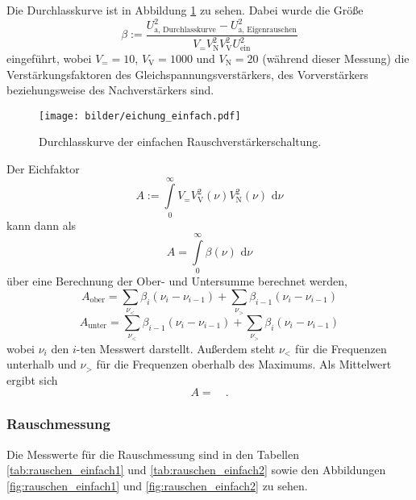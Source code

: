 		Die Durchlasskurve ist in Abbildung \ref{fig:eichung_einfach} zu sehen. Dabei wurde die Größe 
		\begin{equation}
		\beta := \frac{U^2_\text{a, Durchlasskurve}-U_\text{a, Eigenrauschen}^2}
		{V_= V_\text{N}^2 V_\text{V}^2  U^2_\text{ein}}
		\end{equation}
		eingeführt, wobei $V_= =10$, $V_\text{V}=1000$ und $V_\text{N}=20$ (während dieser Messung)
		die Verstärkungsfaktoren des Gleichspannungsverstärkers, des Vorverstärkers beziehungsweise 
		des Nachverstärkers sind.
		
		\begin{figure}
			\centering
			\texttt{[image: bilder/eichung\_einfach.pdf]}
			\caption{Durchlasskurve der einfachen Rauschverstärkerschaltung.}
			\label{fig:eichung_einfach}
		\end{figure}
		
		Der Eichfaktor 
		\begin{equation}
			A:=\int\limits_0^\infty V_= V_\text{V}^2(\nu) V_\text{N}^2(\nu) \text{ d}\nu		
		\end{equation}				
		kann dann als
		\begin{equation}
			A = \int \limits_0^\infty \beta(\nu) \text{ d}\nu
		\end{equation}
		über eine Berechnung der Ober- und Untersumme berechnet werden,
		\begin{equation}
			A_\text{ober} = \sum\limits_{\nu_<} \beta_i (\nu_i-\nu_{i-1}) +
			\sum\limits_{\nu_>} \beta_{i-1} (\nu_i-\nu_{i-1})
		\end{equation}
		\begin{equation}
			A_\text{unter} = \sum\limits_{\nu_<} \beta_{i-1} (\nu_i-\nu_{i-1}) +
			\sum\limits_{\nu_>} \beta_{i} (\nu_i-\nu_{i-1})
		\end{equation}
		wobei $\nu_i$ den $i$-ten Messwert darstellt. Außerdem 
		steht $\nu_<$ für die Frequenzen unterhalb und $\nu_>$ für die 
		Frequenzen oberhalb des Maximums. Als Mittelwert ergibt sich
		\begin{equation}
			A =     \quad . 
		\end{equation}


	
	\subsubsection{Rauschmessung}
		Die Messwerte für die Rauschmessung sind in den Tabellen \ref{tab:rauschen_einfach1} 
		und \ref{tab:rauschen_einfach2} sowie den Abbildungen 
		\ref{fig:rauschen_einfach1} und \ref{fig:rauschen_einfach2} zu sehen.
		
